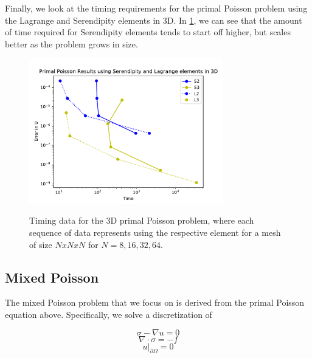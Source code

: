 \documentclass[manuscript,screen]{acmart}
\begin{document}

\noindent Finally, we look at the timing requirements for the primal Poisson problem using the Lagrange and Serendipity elements in 3D.  In \ref{fig:3dPrimalTime}, we can see that the amount of time required for Serendipity elements tends to start off higher, but scales better as the problem grows in size.  

  \begin{figure}[h!]
    \caption{Timing data for the 3D primal Poisson problem, where each sequence of data represents using the respective element for a mesh of size $N x N x N$ for $N = 8, 16, 32, 64$.}
    \includegraphics[width=0.75\textwidth]{3dPrimalTime.pdf}
    \label{fig:3dPrimalTime}
  \end{figure}



  \subsection{Mixed Poisson}
  
  The mixed Poisson problem that we focus on is derived from the primal Poisson equation above.  Specifically, we solve a discretization of
  
  \begin{equation}
    \sigma - \nabla u = 0
\end{equation}
\begin{equation*}
    \nabla \cdot \sigma = -f
\end{equation*}
\begin{equation*}
    u\vert_{\partial \Omega} = 0
\end{equation*}
\end{document}
